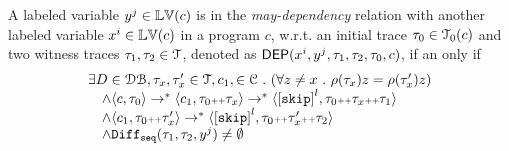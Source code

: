 {%
\begin{defn}
  \label{def:var_dep}
  A labeled variable $y^j \in \mathbb{LV}(c)$ is in the \emph{may-dependency} relation with another
  labeled variable $x^i \in \mathbb{LV}(c)$ in a program ${c}$, w.r.t. an initial trace $\mathtt{\tau}_0 \in \mathcal{T}_0(c)$
  and two witness traces $\mathtt{\tau}_1, \mathtt{\tau}_2 \in \mathcal{T}$,
  denoted as 
  $\mathsf{DEP}(x^i, y^j, \mathtt{\tau}_1, \mathtt{\tau}_2, \mathtt{\tau}_0, {c})$, if an only if
  \[
    \begin{array}{l}
  \exists 
  D \in \dbdom, 
  \trace_x, \trace_x' \in \mathcal{T}, {c}_1, \in \cdom  
  \st (\forall z \neq x \st   \env(\trace_x ) z =   \env(\trace_x') z )
  \\ \quad \land 
  \config{{c}, \trace_0} \rightarrow^{*} 
  \config{{c}_1, \trace_0 \tracecat \trace_x } \rightarrow^{*} 
    \config{\clabel{\eskip}^l, \trace_0 \tracecat \vtrace_x  \tracecat \trace_1 } 
    \\ \quad \land 
    \config{{c}_1, \trace_0 \tracecat \vtrace_x'} \rightarrow^{*} 
      \config{\clabel{\eskip}^l, \trace_0 \tracecat \vtrace_x'  \tracecat \trace_2} 
    \\ \quad \land 
      \sdiff(\trace_1, \trace_2, y^j ) \neq \emptyset
    \end{array}
  \]  
  \end{defn}
}%

\subsection{}

